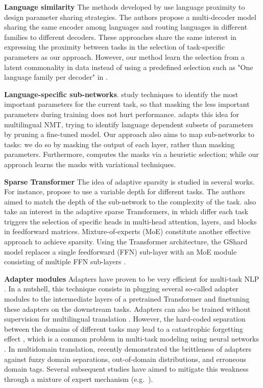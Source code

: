 \documentclass[11pt]{article}
\begin{document}
\textbf{Language similarity} The methods developed by \citep{sen19multilingual,kong21multilingual} use language proximity to design parameter sharing strategies. The authors propose a multi-decoder model sharing the same encoder among languages and routing languages in different families to different decoders. These approaches share the same interest in expressing the proximity between tasks in the selection of task-specific parameters as our approach. However, our method learn the selection from a latent commonality in data instead of using a predefined selection such as "One language family per decoder" in \citep{kong21multilingual}.

\textbf{Language-specific sub-networks}. \done\todo{}\citet{Frankle19Lottery,liu18rethinking} study techniques to identify the most important parameters for the current task, so that masking the less important parameters during training does not hurt performance. \citet{lin21learning} adapts this idea for multilingual NMT, trying to identify language dependent subsets of parameters by pruning a fine-tuned model. Our approach also aims to map sub-networks to tasks: we do so by masking the output of each layer, rather than masking parameters. Furthermore, \citet{lin21learning} computes the masks via a heuristic selection; while our approach learns the masks with variational techniques.

\textbf{Sparse Transformer} The idea of adaptive sparsity is studied in several works. For instance, \citet{xian20deep} propose to use a variable depth for different tasks. The authors aimed to match the depth of the sub-network to the complexity of the task. \citet{Gong21pay,Gong21adaptive} also take an interest in the adaptive sparse Transformers, in which differ each task triggers the selection of specific heads in multi-head attention, layers, and blocks in feedforward matrices. Mixture-of-experts (MoE) constitute another effective approach to achieve sparsity. Using the Transformer architecture, the GShard model replaces a single feedforward (FFN) sub-layer with an MoE module consisting of multiple FFN sub-layers \citep{lepikhin21gshard,william21switch}.

\textbf{Adapter modules} Adapters have proven to be very efficient for multi-task NLP \citep{houlsby19parameter,Bapna19simple,Pham20Study,pfeiffer20adapterhub}. In a nutshell, this technique consists in plugging several so-called adapter modules to the intermediate layers of a pretrained Transformer and finetuning these adapters on the downstream tasks. Adapters can also be trained without supervision for multilingual translation \citep{Philip20monolingual}. However, the hard-coded separation between the domains of different tasks may lead to a catastrophic forgetting effect \citep{pfeiffer21adapterfusion}, which is a common problem in multi-task modeling using neural networks \citep{Michael89catastrophic}. In multidomain translation, \citet{Pham21revisiting} recently demonstrated the brittleness of adapters against fuzzy domain separations, out-of-domain distributions, and erroneous domain tags. Several subsequent studies have aimed to mitigate this weakness through a mixture of expert mechanism (e.g.\ \cite{pfeiffer21adapterfusion}).
\end{document}
